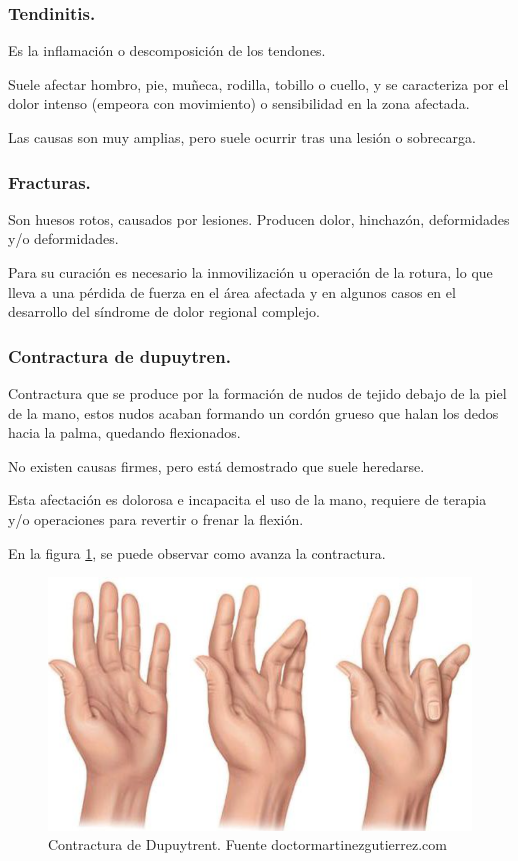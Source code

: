 \subsubsection{Tendinitis.}
Es la inflamación o descomposición de los tendones.\cite{tendinitis-1}

Suele afectar hombro, pie, muñeca, rodilla, tobillo o cuello, y se caracteriza por el dolor intenso (empeora con movimiento) o sensibilidad en la zona afectada. \cite{tendinitis}

Las causas son muy amplias, pero suele ocurrir tras una lesión o sobrecarga.\cite{tendinitis-1}
\subsubsection{Fracturas.}

Son huesos rotos, causados por lesiones. Producen dolor, hinchazón, deformidades y/o deformidades.

Para su curación es necesario la inmovilización u operación de la rotura, lo que lleva a una pérdida de fuerza en el área afectada y en algunos casos en el desarrollo del síndrome de dolor regional complejo.\cite{fracturas}
\subsubsection{Contractura de dupuytren.}
Contractura que se produce por la formación de nudos de tejido debajo de la piel de la mano, estos nudos acaban formando un cordón grueso que halan los dedos hacia la palma, quedando flexionados.  

No existen causas firmes, pero está demostrado que suele heredarse. 

Esta afectación es dolorosa e incapacita el uso de la mano, requiere de terapia y/o operaciones para revertir o frenar la flexión. \cite{contractura_Dupuytren-1}

En la figura \ref{fig:Dupuytrent}, se puede observar como avanza la contractura.

\begin{figure}
    \centering
    \includegraphics[width=0.5\linewidth]{img/Dupuytrent.png}
    \caption{Contractura de Dupuytrent. Fuente doctormartinezgutierrez.com}
    \label{fig:Dupuytrent}
\end{figure}

